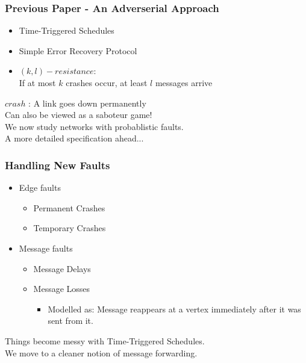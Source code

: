 \documentclass{beamer}
\begin{document}
\begin{frame}
\frametitle{Previous Paper - An Adverserial Approach}
	\begin{itemize}
	\item Time-Triggered Schedules
	\item Simple Error Recovery Protocol %
	\item $(k,l)-resistance$:	\\
	If at most $k$ crashes occur, at least $l$ messages arrive\\[3ex]
	\end{itemize}
	\hspace*{20pt}$ crash $ : A link goes down permanently\\[3ex]
	\pause
	Can also be viewed as a saboteur game!\\[2ex]
	\pause
	\color{blue}
	We now study networks with probablistic faults.\\
	A more detailed specification ahead...
\end{frame}

\begin{frame}
\frametitle{Handling New Faults}
	\begin{itemize}
	\item Edge faults
	\begin{itemize}
		\item Permanent Crashes 
		\item Temporary Crashes
	\end{itemize}
	\item Message faults
	\begin{itemize}
		\item Message Delays
		\item Message Losses
		\begin{itemize}
			\item Modelled as: Message reappears at a vertex immediately after it was sent from it.\\[2ex]
		\end{itemize}
	\end{itemize}
	\end{itemize}
	\pause
	\begin{center}
	\color{red}
	Things become messy with Time-Triggered Schedules.\\We move to a cleaner notion of message forwarding.
	\end{center}
\end{frame}
\end{document}
